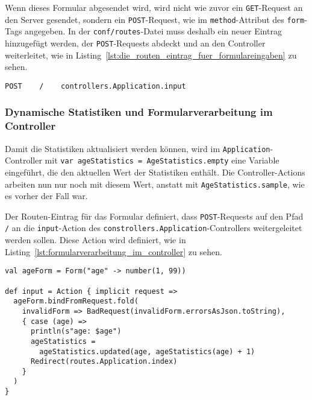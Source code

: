 Wenn dieses Formular abgesendet wird, wird nicht wie zuvor ein \lstinline|GET|-Request an den Server gesendet, sondern ein \lstinline|POST|-Request, wie im \lstinline|method|-Attribut des \lstinline|form|-Tags angegeben.
In der \lstinline|conf/routes|-Datei muss deshalb ein neuer Eintrag hinzugefügt werden, der \lstinline|POST|-Requests abdeckt und an den Controller weiterleitet, wie in Listing~\ref{lst:die_routen_eintrag_fuer_formulareingaben} zu sehen.

\begin{lstlisting}[caption=Die Routen-Eintrag für Formulareingaben, label=lst:die_routen_eintrag_fuer_formulareingaben]
POST    /    controllers.Application.input
\end{lstlisting}


\subsubsection{Dynamische Statistiken und Formularverarbeitung im Controller} %
\label{ssub:formularverarbeitung_im_controller}

Damit die Statistiken aktualisiert werden können, wird im \lstinline|Application|-Controller mit \lstinline|var ageStatistics = AgeStatistics.empty| eine Variable eingeführt, die den aktuellen Wert der Statistiken enthält.
Die Controller-Actions arbeiten nun nur noch mit diesem Wert, anstatt mit \lstinline|AgeStatistics.sample|, wie es vorher der Fall war.

Der Routen-Eintrag für das Formular definiert, dass \lstinline|POST|-Requests auf den Pfad \lstinline|/| an die \lstinline|input|-Action des \lstinline|constrollers.Application|-Controllers weitergeleitet werden sollen.
Diese Action wird definiert, wie in Listing~\ref{lst:formularverarbeitung_im_controller} zu sehen.

\begin{lstlisting}[caption=Formularverarbeitung im Controller, label=lst:formularverarbeitung_im_controller]
val ageForm = Form("age" -> number(1, 99))

def input = Action { implicit request =>
  ageForm.bindFromRequest.fold(
    invalidForm => BadRequest(invalidForm.errorsAsJson.toString),
    { case (age) =>
      println(s"age: $age")
      ageStatistics =
        ageStatistics.updated(age, ageStatistics(age) + 1)
      Redirect(routes.Application.index)
    }
  )
}
\end{lstlisting}

